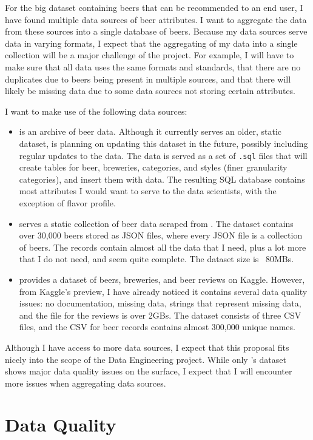 \documentclass[sigconf, natbib=true]{acmart}
\begin{document}
For the big dataset containing beers that can be recommended to an end user, I have found multiple data sources of beer attributes.
I want to aggregate the data from these sources into a single database of beers. 
Because my data sources serve data in varying formats, I expect that the aggregating of my data into a single collection will be a major challenge of the project.
For example, I will have to make sure that all data uses the same formats and standards, that there are no duplicates due to beers being present in multiple sources, and that there will likely be missing data due to some data sources not storing certain attributes.

I want to make use of the following data sources:
\begin{itemize}
    \item \citet{openbeerdb} is an archive of beer data.
    Although it currently serves an older, static dataset, \citeauthor{openbeerdb} is planning on updating this dataset in the future, possibly including regular updates to the data.
    The \citeauthor{openbeerdb} data is served as a set of \texttt{.sql} files that will create tables for beer, breweries, categories, and styles (finer granularity categories), and insert them with data.
    The resulting SQL database contains most attributes I would want to serve to the data scientists, with the exception of flavor profile.
    \item \citet{philipperemy} serves a static collection of beer data scraped from \citet{brewerydb}.
    The dataset contains over 30,000 beers stored as JSON files, where every JSON file is a collection of beers.
    The records contain almost all the data that I need, plus a lot more that I do not need, and seem quite complete.
    The dataset size is ~80MBs.
    \item \citet{evanhallmark} provides a dataset of beers, breweries, and beer reviews on Kaggle.
    However, from Kaggle's preview, I have already noticed it contains several data quality issues: no documentation, missing data, strings that represent missing data, and the file for the reviews is over 2GBs.
    The dataset consists of three CSV files, and the CSV for beer records contains almost 300,000 unique names.
\end{itemize}

Although I have access to more data sources, I expect that this proposal fits nicely into the scope of the Data Engineering project.
While only \citeauthor{evanhallmark}'s dataset shows major data quality issues on the surface, I expect that I will encounter more issues when aggregating data sources.

\section{Data Quality}


\def\bibfont{\small} %
 
\end{document}
